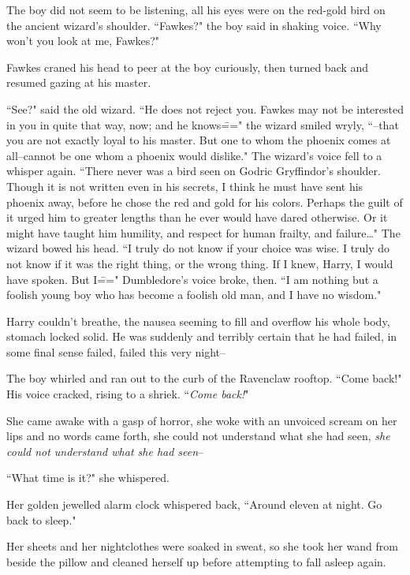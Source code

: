 The boy did not seem to be listening, all his eyes were on the red-gold bird on the ancient wizard's shoulder. ``Fawkes?" the boy said in shaking voice. ``Why won't you look at me, Fawkes?"

Fawkes craned his head to peer at the boy curiously, then turned back and resumed gazing at his master.

``See?" said the old wizard. ``He does not reject you. Fawkes may not be interested in you in quite that way, now; and he knows\===" the wizard smiled wryly, ``\---that you are not exactly loyal to his master. But one to whom the phoenix comes at all\---cannot be one whom a phoenix would dislike." The wizard's voice fell to a whisper again. ``There never was a bird seen on Godric Gryffindor's shoulder. Though it is not written even in his secrets, I think he must have sent his phoenix away, before he chose the red and gold for his colors. Perhaps the guilt of it urged him to greater lengths than he ever would have dared otherwise. Or it might have taught him humility, and respect for human frailty, and failure{\ldots}" The wizard bowed his head. ``I truly do not know if your choice was wise. I truly do not know if it was the right thing, or the wrong thing. If I knew, Harry, I would have spoken. But I\===" Dumbledore's voice broke, then. ``I am nothing but a foolish young boy who has become a foolish old man, and I have no wisdom."

Harry couldn't breathe, the nausea seeming to fill and overflow his whole body, stomach locked solid. He was suddenly and terribly certain that he had failed, in some final sense failed, failed this very night\---

The boy whirled and ran out to the curb of the Ravenclaw rooftop. ``Come back!" His voice cracked, rising to a shriek. ``\emph{Come back!}"


She came awake with a gasp of horror, she woke with an unvoiced scream on her lips and no words came forth, she could not understand what she had seen, \emph{she could not understand what she had seen}\---

``What time is it?" she whispered.

Her golden jewelled alarm clock whispered back, ``Around eleven at night. Go back to sleep."

Her sheets and her nightclothes were soaked in sweat, so she took her wand from beside the pillow and cleaned herself up before attempting to fall asleep again.

